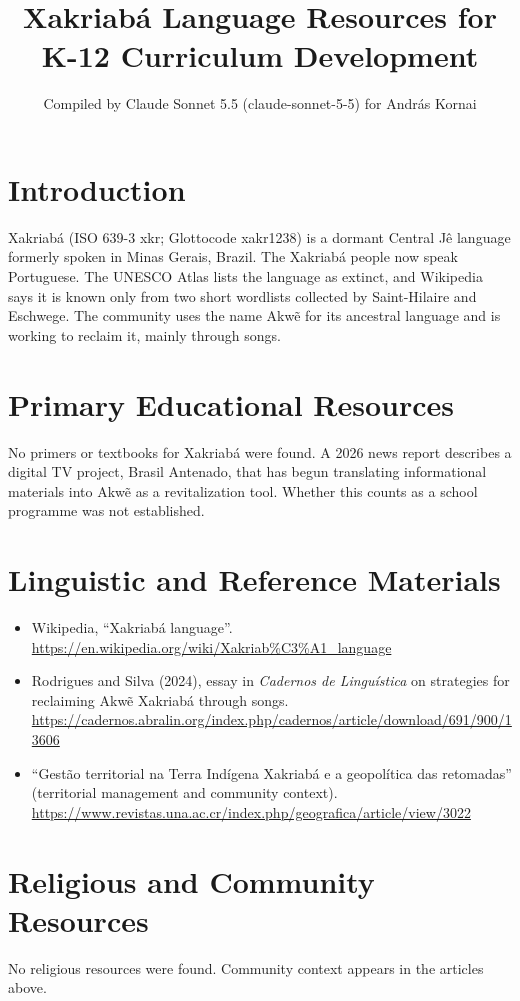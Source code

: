 \documentclass[12pt]{article}
\title{Xakriabá Language Resources for K-12 Curriculum Development}
\author{Compiled by Claude Sonnet 5.5 (claude-sonnet-5-5) for Andr\'as Kornai}
\date{}
\begin{document}
\maketitle

\section{Introduction}
Xakriabá (ISO 639-3 xkr; Glottocode xakr1238) is a dormant Central Jê language formerly spoken in Minas Gerais, Brazil. The Xakriabá people now speak Portuguese. The UNESCO Atlas lists the language as extinct, and Wikipedia says it is known only from two short wordlists collected by Saint-Hilaire and Eschwege. The community uses the name Akwẽ for its ancestral language and is working to reclaim it, mainly through songs.

\section{Primary Educational Resources}
No primers or textbooks for Xakriabá were found. A 2026 news report describes a digital TV project, Brasil Antenado, that has begun translating informational materials into Akwẽ as a revitalization tool. Whether this counts as a school programme was not established.

\section{Linguistic and Reference Materials}
\begin{itemize}
\item Wikipedia, ``Xakriabá language''. \url{https://en.wikipedia.org/wiki/Xakriab%C3%A1_language}
\item Rodrigues and Silva (2024), essay in \emph{Cadernos de Linguística} on strategies for reclaiming Akwẽ Xakriabá through songs. \url{https://cadernos.abralin.org/index.php/cadernos/article/download/691/900/13606}
\item ``Gest\~ao territorial na Terra Ind\'igena Xakriab\'a e a geopol\'itica das retomadas'' (territorial management and community context). \url{https://www.revistas.una.ac.cr/index.php/geografica/article/view/3022}
\end{itemize}

\section{Religious and Community Resources}
No religious resources were found. Community context appears in the articles above.
\end{document}
